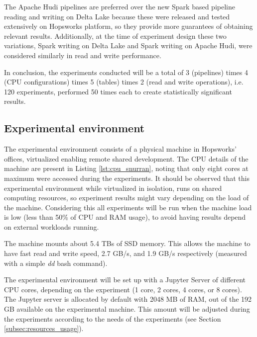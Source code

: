 The Apache Hudi pipelines are preferred over the new Spark based pipeline reading and writing on Delta Lake because these were released and tested extensively on Hopsworks platform, so they provide more guarantees of obtaining relevant results. Additionally, at the time of experiment design these two variations, Spark writing on Delta Lake and Spark writing on Apache Hudi, were considered similarly in read and write performance. 

In conclusion, the experiments conducted will be a total of 3 (pipelines) times 4 (\gls{CPU} configurations) times 5 (tables) times 2 (read and write operations), i.e. 120 experiments, performed 50 times each to create statistically significant results.

\subsection{Experimental environment}
\label{subsec:exp_env}

The experimental environment consists of a physical machine in Hopsworks' offices, virtualized enabling remote shared development. The \gls{CPU} details of the machine are present in Listing \ref{lst:cpu_snurran}, noting that only eight cores at maximum were accessed during the experiments. It should be observed that this experimental environment while virtualized in isolation, runs on shared computing resources, so experiment results might vary depending on the load of the machine. Considering this all experiments will be run when the machine load is low (less than 50\% of \gls{CPU} and \gls{RAM} usage), to avoid having results depend on external workloads running.

The machine mounts about 5.4 TBs of \gls{SSD} memory. This allows the machine to have fast read and write speed, 2.7 GB/s, and 1.9 GB/s respectively (measured with a simple \textit{dd} bash command). 

The experimental environment will be set up with a Jupyter Server of different CPU cores, depending on the experiment (1 core, 2 cores, 4 cores, or 8 cores). The Jupyter server is allocated by default with 2048 MB of \gls{RAM}, out of the 192 GB  available on the experimental machine. This amount will be adjusted during the experiments according to the needs of the experiments (see Section \ref{subsec:resources_usage}).

